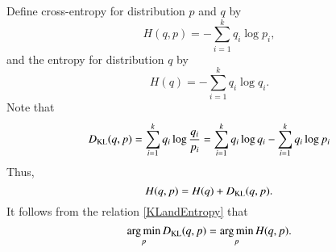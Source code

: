 Define cross-entropy for distribution $p$ and $q$ by
\begin{equation}\label{Cross-Entropy}
H(q,p) = - \sum_{i=1}^k q_i \log p_i,
\end{equation}
and the entropy for distribution $q$ by 
\begin{equation}\label{Entropy}
H(q) = - \sum_{i=1}^k q_i \log q_i.
\end{equation}
Note that
\begin{equation}
D_{\rm KL}(q,p)= \sum_{i=1}^k q_i\log \frac{q_i}{p_i} =  \sum_{i=1}^k q_i \log q_i - \sum_{i=1}^k q_i \log p_i
\end{equation}
Thus, 
\begin{equation}\label{KLandEntropy}
H(q,p) = H(q) + D_{\rm KL}(q,p).
\end{equation} 
It follows from the relation \eqref{KLandEntropy} that
\begin{equation}
\label{EntropyandKL}
\mathop{\arg\min}_p D_{\rm KL}(q,p)=\mathop{\arg\min}_p H(q,p).
\end{equation}

